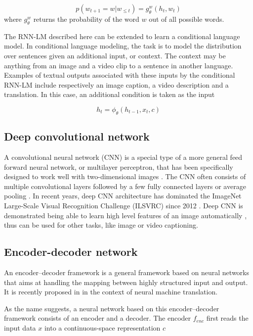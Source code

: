 \begin{equation}
p(w_{t+1}=w|w_{\le t})=g_{\theta}^w(h_t,w_t)
\end{equation}
where $g_{\theta}^w$ returns the probability of the word $w$ out of all possible words.

The RNN-LM described here can be extended to learn a conditional language model. In conditional language modeling, the task is to model the distribution over sentences given an additional input, or context. The context may be anything from an image and a video clip to a sentence in another language. Examples of textual outputs associated with these inputs by the conditional RNN-LM include respectively an image caption, a video description and a translation. In this case, an additional condition is taken as the input

\begin{equation}
h_t=\phi_\theta(h_{t-1},x_t,c)
\end{equation}

\subsection{Deep convolutional network}
A convolutional neural network (CNN) is a special type of a more general feed forward neural network, or multilayer perceptron, that has been specifically designed to work well with two-dimensional images \cite{lecun1998gradient}. The CNN often consists of multiple convolutional layers followed by a few fully connected layers or average pooling \cite{lin2013network,szegedy2015going}. In recent years, deep CNN architecture has dominated the ImageNet Large-Scale Visual Recognition Challenge (ILSVRC) since 2012 \cite{krizhevsky2012imagenet,simonyan2014very,szegedy2015going,he2015deep}. Deep CNN is demonstrated being able to learn high level features of an image automatically \cite{zeiler2014visualizing}, thus can be used for other tasks, like image or video captioning.

\subsection{Encoder-decoder network}
An encoder–decoder framework is a general framework based on neural networks that aims at handling the mapping between highly structured input and output. It is recently proposed in \cite{sutskever2014sequence,cho2014learning} in the context of neural machine translation.

As the name suggests, a neural network based on this encoder–decoder framework consists of an encoder and a decoder. The encoder $f_{enc}$ first reads the input data $x$ into a continuous-space representation $c$

